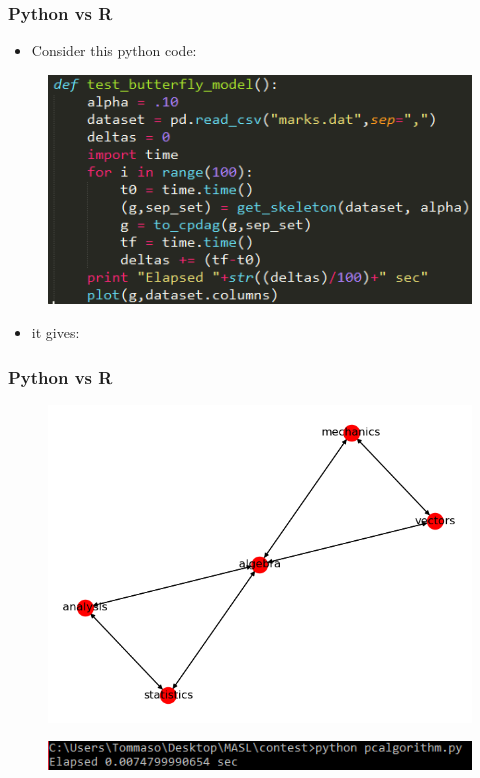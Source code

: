\documentclass[xcolor ={table,usenames,dvipsnames}]{beamer}
\theoremstyle{definition}
\begin{document}
\begin{frame}
\frametitle{Python vs R}
\begin{itemize}
	\item Consider this python code:
	\end{itemize}
\begin{figure}[h!]
	\centering
	\includegraphics[scale=0.7]{img/py.PNG}
\end{figure}
\begin{itemize}
	\item it gives:
\end{itemize}
\end{frame}
\begin{frame}
\frametitle{Python vs R}
\begin{figure}[h!]
	\centering
	\includegraphics[scale=0.4]{img/pydag}
\end{figure}
\begin{figure}[h!]
	\centering
	\includegraphics[scale=0.8]{img/pytime}
\end{figure}
\end{frame}
\end{document}

